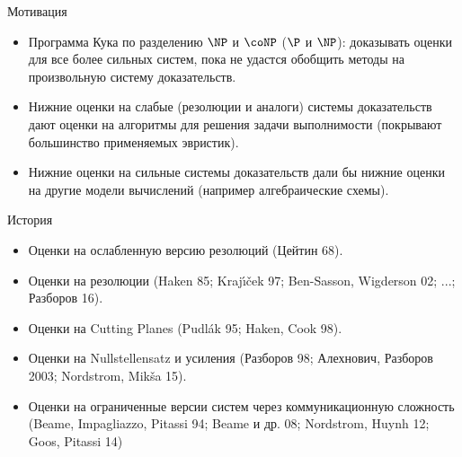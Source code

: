 \begin{frame}{Мотивация}

    \begin{itemize}
        \item Программа Кука по разделению $\NP$ и $\coNP$ ($\P$ и $\NP$): доказывать оценки для {\color{blue} все более
            сильных} систем, пока не удастся обобщить методы на произвольную систему доказательств.
        \pause
        \item Нижние оценки на {\color{blue} слабые} (резолюции и аналоги) системы доказательств дают оценки на алгоритмы для
            решения задачи выполнимости (покрывают большинство применяемых эвристик).
        \pause
        \item Нижние оценки на {\color{blue} сильные} системы доказательств дали бы нижние оценки на другие модели вычислений
            (например алгебраические схемы).
    \end{itemize}
\end{frame}


\begin{frame}{История}

    \begin{itemize}
        \item Оценки на ослабленную версию резолюций (Цейтин 68).
        \pause
        \item Оценки на резолюции (Haken 85; Kraj{\'{\i}}{\v{c}}ek 97; Ben-Sasson, Wigderson 02; ...; Разборов 16).
        \pause
        \item Оценки на Cutting Planes (Pudl{\'{a}}k 95; Haken, Cook 98).
        \pause
        \item Оценки на Nullstellensatz и усиления (Разборов 98; Алехнович, Разборов 2003; Nordstrom, Mik{\v{s}}a 15).
        \pause
        \item Оценки на ограниченные версии систем через коммуникационную сложность (Beame, Impagliazzo, Pitassi 94; Beame и
            др. 08; Nordstrom, Huynh 12; Goos, Pitassi 14)
    \end{itemize}

\end{frame}

